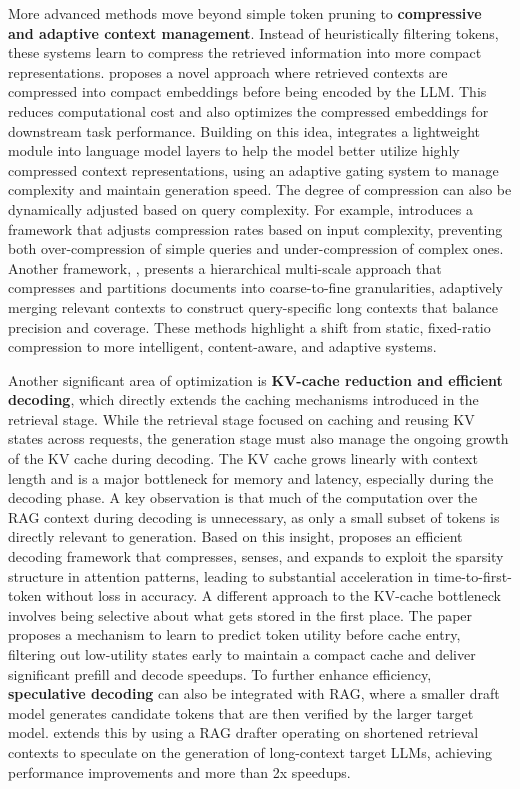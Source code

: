 \documentclass[11pt]{article}
\begin{document}
More advanced methods move beyond simple token pruning to \textbf{compressive and adaptive context management}. Instead of heuristically filtering tokens, these systems learn to compress the retrieved information into more compact representations. \cite{ref525} proposes a novel approach where retrieved contexts are compressed into compact embeddings before being encoded by the LLM. This reduces computational cost and also optimizes the compressed embeddings for downstream task performance. Building on this idea, \cite{ref526} integrates a lightweight module into language model layers to help the model better utilize highly compressed context representations, using an adaptive gating system to manage complexity and maintain generation speed. The degree of compression can also be dynamically adjusted based on query complexity. For example, \cite{ref527} introduces a framework that adjusts compression rates based on input complexity, preventing both over-compression of simple queries and under-compression of complex ones. Another framework, \cite{ref528}, presents a hierarchical multi-scale approach that compresses and partitions documents into coarse-to-fine granularities, adaptively merging relevant contexts to construct query-specific long contexts that balance precision and coverage. These methods highlight a shift from static, fixed-ratio compression to more intelligent, content-aware, and adaptive systems.

Another significant area of optimization is \textbf{KV-cache reduction and efficient decoding}, which directly extends the caching mechanisms introduced in the retrieval stage. While the retrieval stage focused on caching and reusing KV states across requests, the generation stage must also manage the ongoing growth of the KV cache during decoding. The KV cache grows linearly with context length and is a major bottleneck for memory and latency, especially during the decoding phase. A key observation is that much of the computation over the RAG context during decoding is unnecessary, as only a small subset of tokens is directly relevant to generation. Based on this insight, \cite{ref529} proposes an efficient decoding framework that compresses, senses, and expands to exploit the sparsity structure in attention patterns, leading to substantial acceleration in time-to-first-token without loss in accuracy. A different approach to the KV-cache bottleneck involves being selective about what gets stored in the first place. The \cite{ref530} paper proposes a mechanism to learn to predict token utility before cache entry, filtering out low-utility states early to maintain a compact cache and deliver significant prefill and decode speedups. To further enhance efficiency, \textbf{speculative decoding} can also be integrated with RAG, where a smaller draft model generates candidate tokens that are then verified by the larger target model. \cite{ref531} extends this by using a RAG drafter operating on shortened retrieval contexts to speculate on the generation of long-context target LLMs, achieving performance improvements and more than 2x speedups.
\end{document}
